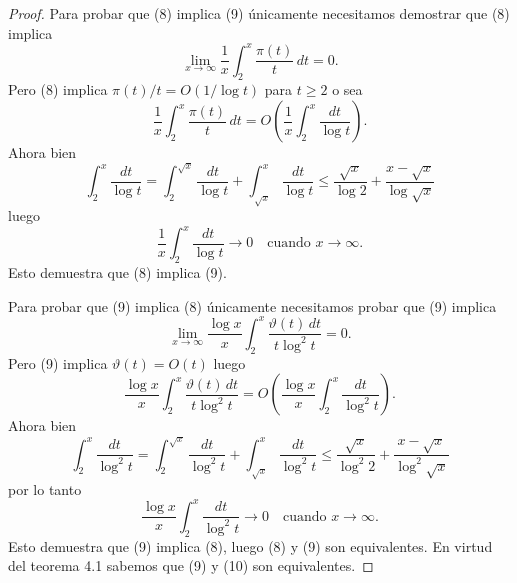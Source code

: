 \documentclass[12pt,a4paper]{book}
\begin{document}
    \begin{proof}
        Para probar que (8) implica (9) únicamente necesitamos demostrar que (8)
        implica
        \begin{equation*}
            \lim_{x\to\infty}\frac{1}{x}\int_{2}^{x}\frac{\pi(t)}{t}\,dt=0.
        \end{equation*}
        Pero (8) implica $\pi(t)/t=O(1/\log t)$ para $t\geq2$ o sea
        \begin{equation*}
            \frac{1}{x}\int_{2}^{x}\frac{\pi(t)}{t}\,dt=O\left(\frac{1}{x}\int_{2}^{x}\frac{dt}{\log t}\right).
        \end{equation*}
        Ahora bien
        \begin{equation*}
            \int_{2}^{x}\frac{dt}{\log t}=\int_{2}^{\sqrt{x}}\frac{dt}{\log t}+\int_{\sqrt{x}}^{x}\frac{dt}{\log t}
            \leq\frac{\sqrt{x}}{\log2}+\frac{x-\sqrt{x}}{\log\sqrt{x}}
        \end{equation*}
        luego
        \begin{equation*}
            \frac{1}{x}\int_{2}^{x}\frac{dt}{\log t}\to0\quad\text{cuando } x\to\infty.
        \end{equation*}
        Esto demuestra que (8) implica (9).

        Para probar que (9) implica (8) únicamente necesitamos probar que (9) implica
        \begin{equation*}
            \lim_{x\to\infty}\frac{\log x}{x}\int_{2}^{x}\frac{\vartheta(t)\,dt}{t\log^{2}t}=0.
        \end{equation*}
        Pero (9) implica $\vartheta(t)=O(t)$ luego
        \begin{equation*}
            \frac{\log x}{x}\int_{2}^{x}\frac{\vartheta(t)\,dt}{t\log^{2}t}
            =O\left(\frac{\log x}{x}\int_{2}^{x}\frac{dt}{\log^{2}t}\right).
        \end{equation*}
        Ahora bien
        \begin{equation*}
            \int_{2}^{x}\frac{dt}{\log^{2}t}=\int_{2}^{\sqrt{x}}\frac{dt}{\log^{2}t}+\int_{\sqrt{x}}^{x}\frac{dt}{\log^{2}t}
            \leq\frac{\sqrt{x}}{\log^{2}2}+\frac{x-\sqrt{x}}{\log^{2}\sqrt{x}}
        \end{equation*}
        por lo tanto
        \begin{equation*}
            \frac{\log x}{x}\int_{2}^{x}\frac{dt}{\log^{2}t}\to0\quad\text{cuando } x\to\infty.
        \end{equation*}
        Esto demuestra que (9) implica (8), luego (8) y (9) son equivalentes. En
        virtud del teorema 4.1 sabemos que (9) y (10) son equivalentes.
    \end{proof}
\end{document}
